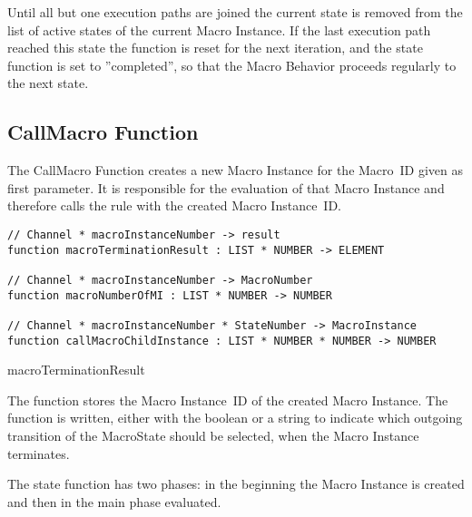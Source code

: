 Until all but one execution paths are joined the current state is removed
from the list of active states of the current Macro Instance. If the last
execution path reached this state the  function is reset for the next
iteration, and the state function is set to ''completed'', so that the Macro Behavior proceeds
regularly to the next state.





\subsection{CallMacro Function}


The CallMacro Function creates a new Macro Instance for the Macro~ID given as
first parameter. It is responsible for the evaluation of that Macro Instance
and therefore calls the  rule with the created Macro
Instance~ID.


\begin{listing}[htbp]
\begin{verbatim}
// Channel * macroInstanceNumber -> result
function macroTerminationResult : LIST * NUMBER -> ELEMENT

// Channel * macroInstanceNumber -> MacroNumber
function macroNumberOfMI : LIST * NUMBER -> NUMBER

// Channel * macroInstanceNumber * StateNumber -> MacroInstance
function callMacroChildInstance : LIST * NUMBER * NUMBER -> NUMBER
\end{verbatim}
\caption{macroTerminationResult}
\label{lst:shortasm:macroTerminationResult}
\end{listing}



The  function stores the Macro Instance~ID
of the created Macro Instance. The 
function is written, either with the boolean  or a string to
indicate which outgoing transition of the MacroState should be selected, when the
Macro Instance terminates.

The state function has two phases: in the beginning the Macro Instance is created
and then in the main phase evaluated.



